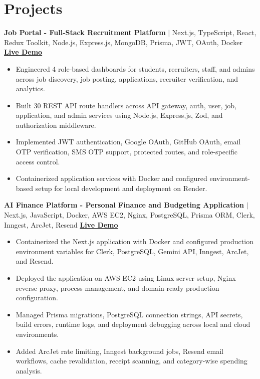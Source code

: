 \documentclass[10pt,a4paper]{article}
\newcommand{\resumeItem}[1]{\item\small #1}
\newcommand{\resumeProject}[3]{%
  \textbf{#1} $|$ \small #2 \hfill \small #3
}
\newcommand{\liveDemo}[1]{\textbf{\href{#1}{Live Demo}}}
\begin{document}
\section{Projects}
\resumeProject
  {Job Portal - Full-Stack Recruitment Platform}
  {Next.js, TypeScript, React, Redux Toolkit, Node.js, Express.js, MongoDB, Prisma, JWT, OAuth, Docker}
  {\liveDemo{https://job-portal-frontend-bhkj.onrender.com}}
\begin{itemize}[leftmargin=*, topsep=2pt, itemsep=2pt]
  \resumeItem{Engineered 4 role-based dashboards for students, recruiters, staff, and admins across job discovery, job posting, applications, recruiter verification, and analytics.}
  \resumeItem{Built 30 REST API route handlers across API gateway, auth, user, job, application, and admin services using Node.js, Express.js, Zod, and authorization middleware.}
  \resumeItem{Implemented JWT authentication, Google OAuth, GitHub OAuth, email OTP verification, SMS OTP support, protected routes, and role-specific access control.}
  \resumeItem{Containerized application services with Docker and configured environment-based setup for local development and deployment on Render.}
\end{itemize}

\resumeProject
  {AI Finance Platform - Personal Finance and Budgeting Application}
  {Next.js, JavaScript, Docker, AWS EC2, Nginx, PostgreSQL, Prisma ORM, Clerk, Inngest, ArcJet, Resend}
  {\liveDemo{https://ai-finance-ruby.vercel.app/}}
\begin{itemize}[leftmargin=*, topsep=2pt, itemsep=2pt]
  \resumeItem{Containerized the Next.js application with Docker and configured production environment variables for Clerk, PostgreSQL, Gemini API, Inngest, ArcJet, and Resend.}
  \resumeItem{Deployed the application on AWS EC2 using Linux server setup, Nginx reverse proxy, process management, and domain-ready production configuration.}
  \resumeItem{Managed Prisma migrations, PostgreSQL connection strings, API secrets, build errors, runtime logs, and deployment debugging across local and cloud environments.}
  \resumeItem{Added ArcJet rate limiting, Inngest background jobs, Resend email workflows, cache revalidation, receipt scanning, and category-wise spending analysis.}
\end{itemize}
\end{document}
